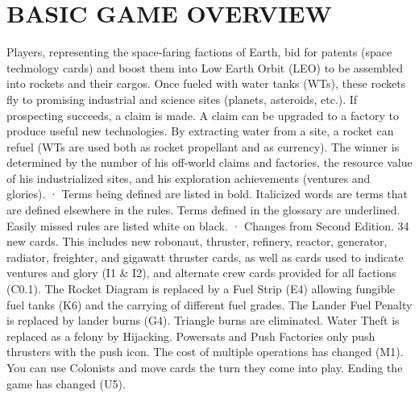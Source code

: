\documentclass[a4paper]{book}
\begin{document}
\chapter{BASIC GAME OVERVIEW}
Players, representing the space-faring factions of Earth, bid for patents (space technology cards) and boost them into Low Earth Orbit (LEO) to be assembled into rockets and their cargos. Once fueled with water tanks (WTs), these rockets fly to promising industrial and science sites (planets, asteroids, etc.). If prospecting succeeds, a claim is made. A claim can be upgraded to a factory to produce useful new technologies. By extracting water from a site, a rocket can refuel (WTs are used both as rocket propellant and as currency). The winner is determined by the number of his off-world claims and factories, the resource value of his industrialized sites, and his exploration achievements (ventures and glories).
·   Terms being defined are listed in bold. Italicized words are terms that are defined elsewhere in the rules. Terms defined in the glossary are underlined. Easily missed rules are listed white on black.
·   Changes from Second Edition. 34 new cards. This includes new robonaut, thruster, refinery, reactor, generator, radiator, freighter, and gigawatt thruster cards, as well as cards used to indicate ventures and glory (I1 \& I2), and alternate crew cards provided for all factions (C0.1). The Rocket Diagram is replaced by a Fuel Strip (E4) allowing fungible fuel tanks (K6) and the carrying of different fuel grades. The Lander Fuel Penalty is replaced by lander burns (G4). Triangle burns are eliminated. Water Theft is replaced as a felony by Hijacking. Powersats and Push Factories only push thrusters with the push icon. The cost of multiple operations has changed (M1). You can use Colonists and move cards the turn they come into play. Ending the game has changed (U5).
 
\end{document}
